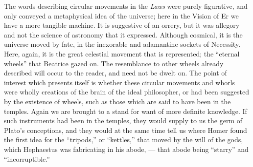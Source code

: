 \documentclass[a4paper, 11pt, oneside, polutonikogreek, english]{article}
\begin{document}
The words describing circular movements in the \emph{Laws} were purely figurative, and only conveyed a metaphysical idea of the universe; here in the Vision of Er we have a more tangible machine. It is suggestive of an orrery, but it was allegory and not the science of astronomy that it expressed. Although cosmical, it is the universe moved by fate, in the inexorable and adamantine sockets of Necessity. Here, again, it is the great celestial movement that is represented; the ``eternal wheels'' that Beatrice gazed on. The resemblance to other wheels already described will occur to the reader, and need not be dwelt on. The point of interest which presents itself is whether these circular movements and whorls were wholly creations of the brain of the ideal philosopher, or had been suggested by the existence of wheels, such as those which are said to have been in the temples. Again we are brought to a stand for want of more definite knowledge. If such instruments had been in the temples, they would supply to us the germ of Plato's conceptions, and they would at the same time tell us where Homer found the first idea for the ``tripods,'' or ``kettles,'' that moved by the will of the gods, which Hephaestus was fabricating in his abode, --- that abode being ``starry'' and ``incorruptible.''
\end{document}
